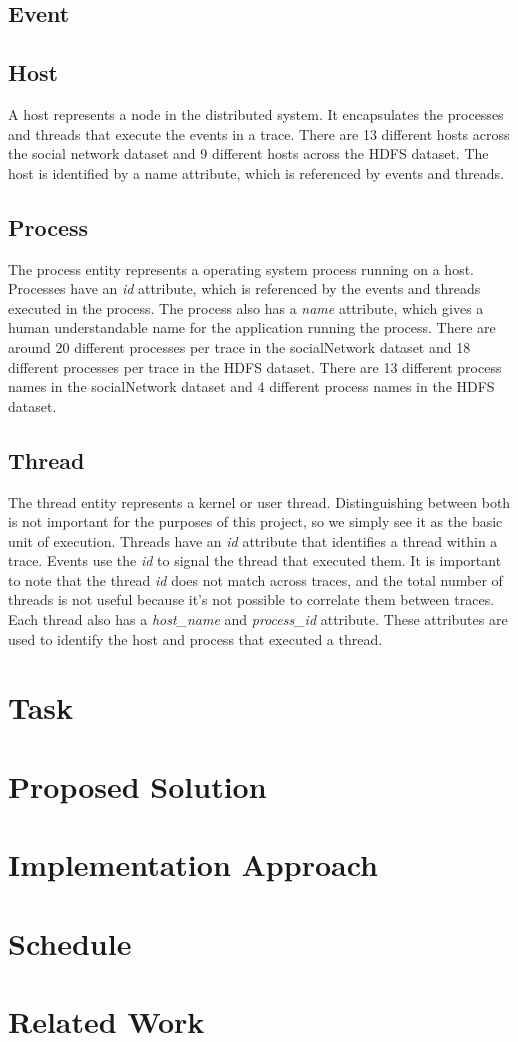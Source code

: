 \documentclass{article}
\begin{document}
\subsection{Event}

\subsection{Host}

A host represents a node in the distributed system. It encapsulates the processes and threads
that execute the events in a trace. There are 13 different hosts across the social network dataset
and 9 different hosts across the HDFS dataset. The host is identified by a name attribute, which is
referenced by events and threads.

\subsection{Process}

The process entity represents a operating system process running on
a host. Processes have an \textit{id} attribute, which is referenced by the events and threads executed in
the process. The process also has a \textit{name} attribute, which gives a human understandable name for the
application running the process. There are around 20 different processes per trace in the socialNetwork
dataset and 18 different processes per trace in the HDFS dataset. There are 13 different process names
in the socialNetwork dataset and 4 different process names in the HDFS dataset.

\subsection{Thread}

The thread entity represents
a kernel or user thread. Distinguishing between both is not important for the purposes of this project, so we
simply see it as the basic unit of execution. Threads have an \textit{id} attribute that identifies a thread
within a trace. Events use the \textit{id} to signal the thread that executed them. It is important to note
that the thread \textit{id} does not match across traces, and the total number of threads is not useful because it's
not possible to correlate them between traces. Each thread also has a \textit{host\_name} and \textit{process\_id}
attribute. These attributes are used to identify the host and process that executed a thread. 

\section{Task}

\section{Proposed Solution}

\section{Implementation Approach}

\section{Schedule}

\section{Related Work}
\end{document}
